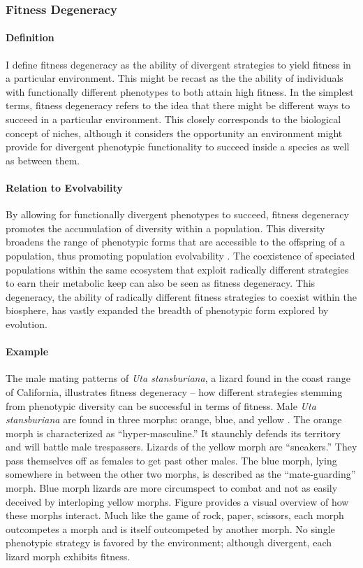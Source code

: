 \subsubsection{Fitness Degeneracy}

\paragraph{Definition}
I define fitness degeneracy as the ability of divergent strategies to yield fitness in a particular environment. This might be recast as the the ability of individuals with functionally different phenotypes to both attain high fitness. In the simplest terms, fitness degeneracy refers to the idea that there might be different ways to succeed in a particular environment. This closely corresponds to the biological concept of niches, although it considers the opportunity an environment might provide for divergent phenotypic functionality to succeed inside a species as well as between them.

\paragraph{Relation to Evolvability}
By allowing for functionally divergent phenotypes to succeed, fitness degeneracy promotes the accumulation of diversity within a population. This diversity broadens the range of phenotypic forms that are accessible to the offspring of a population, thus promoting population evolvability \mindmapmark{\populationevolvabilityfitnessdegeneracy}. The coexistence of speciated populations within the same ecosystem that exploit radically different strategies to earn their metabolic keep  
can also be seen as fitness degeneracy. This degeneracy, the ability of radically different fitness strategies to coexist within the biosphere, has vastly expanded the breadth of phenotypic form explored by evolution. 

\paragraph{Example}
The male mating patterns of \textit{Uta stansburiana}, a lizard found in the coast range of California, illustrates fitness degeneracy -- how different strategies stemming from phenotypic diversity can be successful in terms of fitness. Male \textit{Uta stansburiana} are found in three morphs: orange, blue, and yellow \cite{Sinervo1996TheStrategies}. The orange morph is characterized as ``hyper-masculine.'' It staunchly defends its territory and will battle male trespassers. Lizards of the yellow morph are ``sneakers.'' They pass themselves off as females to get past other males. The blue morph, lying somewhere in between the other two morphs, is described as the ``mate-guarding'' morph. Blue morph lizards are more circumspect to combat and not as easily deceived by interloping yellow morphs. Figure  provides a visual overview of how these morphs interact. Much like the game of rock, paper, scissors, each morph outcompetes a morph and is itself outcompeted by another morph. No single phenotypic strategy is favored by the environment; although divergent, each lizard morph exhibits fitness.

